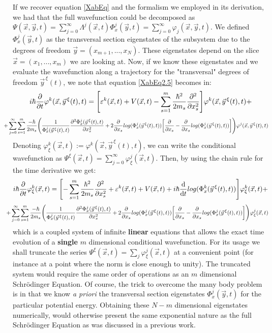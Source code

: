 \documentclass[11pt, a4paper]{article} %
\begin{document}
If we recover equation \eqref{XabEq} and the formalism we employed in its derivation, we had that the full wavefunction could be decomposed as $\Psi(\vec{x},\vec{y},t)=\sum_{j=0}^\infty\Lambda^j(\vec{x},t)\Phi^j_x(\vec{y},t)=\sum_{j=0}^\infty \varphi_j(\vec{x},\vec{y},t)$. We defined $\Phi^j_x(\vec{y},t)$ as the transversal section eigenstates of the subsystem due to the degrees of freedom $\vec{y}=(x_{m+1},...,x_N)$. These eigenstates depend on the slice $\vec{x}=(x_1,...,x_m)$ we are looking at. Now, if we know these eigenstates and we evaluate the wavefunction along a trajectory for the "transversal" degrees of freedom $\vec{y}^{\, \xi}(t)$, we note that equation \eqref{XabEq2.5} becomes in:
\begin{equation}
 i\hbar\pdv{}{t}\varphi^k(\vec{x},\vec{y}^{\, \xi}(t),t)=\qty[ \varepsilon^k(\vec{x},t)+V(\vec{x},t)  -\sum_{s=1}^m\frac{\hbar^2}{2m_s}\pdv[2]{}{x_s} ]\varphi^k(\vec{x},\vec{y}^{\, \xi}(t),t)+
\end{equation}
$$
\hspace{-0.6cm}+\sum_{j=0}^\infty\sum_{s=1}^m \frac{-\hbar}{2m_s}\qty( \frac{1}{\Phi^j_x(\vec{y}^{\, \xi}(t),t)}\pdv[2]{\Phi^j_x(\vec{y}^{\, \xi}(t),t)}{x_s}+2\pdv{}{x_s}log(\Phi^j_x(\vec{y}^{\, \xi}(t),t))\qty[\pdv{}{x_s}-\pdv{}{x_s}log(\Phi^j_x(\vec{y}^{\, \xi}(t),t))] )\varphi^j(\vec{x},\vec{y}^{\, \xi}(t),t)
$$
Denoting $\varphi^k_\xi(\vec{x},t):=\varphi^k(\vec{x},\vec{y}^{\, \xi}(t),t)$, we can write the conditional wavefunction as $\Psi^\xi(\vec{x},t)=\sum_{j=0}^\infty \varphi^j_\xi(\vec{x},t)$. Then, by using the chain rule for the time derivative we get:
\begin{equation}\label{XabEq3}
 i\hbar\pdv{}{t}\varphi^k_\xi(\vec{x},t)=\qty[-\sum_{s=1}^m\frac{\hbar^2}{2m_s}\pdv[2]{}{x_s}+ \varepsilon^k(\vec{x},t)+V(\vec{x},t)   +i\hbar \dv{}{t}log(\Phi^k_x(\vec{y}^{\, \xi}(t),t))]\varphi^k_\xi(\vec{x},t)+
\end{equation}
$$
\hspace{-0.4cm}+\sum_{j=0}^\infty\sum_{s=1}^m \frac{-\hbar}{2m_s}\qty( \frac{1}{\Phi^j_x(\vec{y}^{\, \xi}(t),t)}\pdv[2]{\Phi^j_x(\vec{y}^{\, \xi}(t),t)}{x_s}+2\pdv{}{x_s}log(\Phi^j_x(\vec{y}^{\, \xi}(t),t))\qty[\pdv{}{x_s}-\pdv{}{x_s}log(\Phi^j_x(\vec{y}^{\, \xi}(t),t))] )\varphi^j_\xi(\vec{x},t)
$$
which is a coupled system of infinite {\bf linear} equations that allows the exact time evolution of a {\bf single} $m$ dimensional conditional wavefunction. For its usage we shall truncate the series $\Psi^\xi(\vec{x},t)=\sum_j \varphi^j_\xi(\vec{x},t)$ at a convenient point (for instance at a point where the norm is close enough to unity). The truncated system would require the same order of operations as an $m$ dimensional Schrödinger Equation. Of course, the trick to overcome the many body problem is in that we know {\em a priori} the transversal section eigenstates $\Phi^j_x(\vec{y},t)$ for the particular potential energy. Obtaining these $N-m$ dimensional eigenstates numerically, would otherwise present the same exponential nature as the full Schrödinger Equation as was discussed in a previous work.
\end{document}
